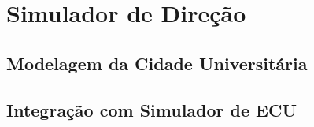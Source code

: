 \chapter{Simulador de Direção}
\section{Modelagem da Cidade Universitária}
\section{Integração com Simulador de ECU}